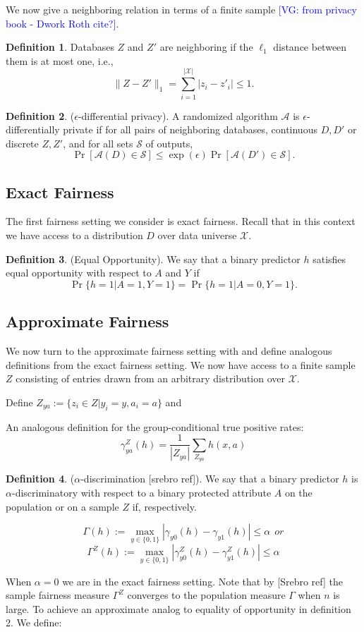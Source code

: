 \documentclass[format = sigconf]{acmart}
\newcommand{\vg}[1]{\textcolor{blue}{[VG: #1]}}
\newcommand{\A}{\mathcal{A}}
\newcommand{\X}{\mathcal{X}}
\newcommand{\1}{\mathbbm{1}}
\renewcommand{\S}{\mathcal{S}}
\theoremstyle{definition}
\newtheorem{defn}{Definition}[section]
\begin{document}
We now give a neighboring relation in terms of a finite sample \vg{from privacy book - Dwork Roth cite?}.

\begin{defn}
Databases $Z$ and $Z'$ are neighboring if the $\ell_1$ distance between them is at most one, i.e.,
$$ \|Z - Z'\|_1 = \sum_{i=1}^{|\X|} |z_i - z'_i| \leq 1.$$
\end{defn}

\begin{defn}
($\epsilon$-differential privacy). A randomized algorithm $\A$ is $\epsilon$-differentially private if for all pairs of neighboring databases, continuous $D, D'$ or discrete $Z, Z'$, and for all sets $\S$ of outputs,
	$$\Pr[\A(D)\in \S] \leq \exp(\epsilon)\Pr[\A(D')\in \S].$$
\end{defn}

\subsection{Exact Fairness}

The first fairness setting we consider is exact fairness. Recall that in this context we have access to a distribution $D$ over data universe $\X$.

\begin{defn}
	 (Equal Opportunity). We say that a binary predictor $h$ satisfies equal opportunity with respect to $A$ and $Y$ if
	$$\Pr\{h = 1 | A =1, Y=1\} = \Pr\{h = 1 | A=0, Y=1\}.$$
\end{defn}

\subsection{Approximate Fairness}
We now turn to the approximate fairness setting with and define analogous definitions from the exact fairness setting. We now have access to a finite sample $Z$ consisting of entries drawn from an arbitrary distribution over $\X$.

Define $Z_{ya} := \{z_i \in Z | y_i = y, a_i = a \}$ and

An analogous definition for the group-conditional true positive rates:
$$\gamma_{ya}^Z(h) = \frac{1}{|Z_{ya}|} \sum_{Z_{ya}} h(x,a)$$

\begin{defn}
	($\alpha$-discrimination [srebro ref]). We say that a binary predictor $h$ is $\alpha$-discriminatory with respect to a binary protected attribute $A$ on the population or on a sample $Z$ if, respectively.

$$\Gamma(h) := \max_{y\in \{0,1\}}|\gamma_{y0}(h) - \gamma_{y1}(h)| \leq \alpha ~~ or $$
$$\Gamma^Z(h) := \max_{y\in \{0,1\}}|\gamma_{y0}^Z(h) - \gamma_{y1}^Z(h)| \leq \alpha$$

\end{defn}
When $\alpha = 0$ we are in the exact fairness setting. Note that by [Srebro ref] the sample fairness measure $\Gamma^Z$ converges to the population measure $\Gamma$ when $n$ is large. To achieve an approximate analog to equality of opportunity in definition 2. We define:
\end{document}
